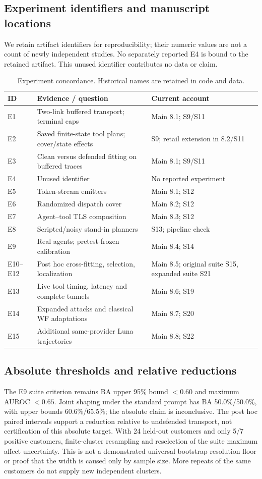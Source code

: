 \subsection{Experiment identifiers and manuscript locations}
We retain artifact identifiers for reproducibility; their numeric values are not a count of newly independent studies. No separately reported E4 is bound to the retained artifact. This unused identifier contributes no data or claim.
\begin{table}[!ht]\centering\footnotesize
\caption{Experiment concordance. Historical names are retained in code and data.}\label{tab:experiment-concordance}
\begin{tabularx}{\columnwidth}{@{}lYY@{}}\toprule
ID & Evidence / question & Current account\\\midrule
E1 & Two-link buffered transport; terminal caps & Main 8.1; S9/S11\\
E2 & Saved finite-state tool plans; cover/state effects & S9; retail extension in 8.2/S11\\
E3 & Clean versus defended fitting on buffered traces & Main 8.1; S9/S11\\
E4 & Unused identifier & No reported experiment\\
E5 & Token-stream emitters & Main 8.1; S12\\
E6 & Randomized dispatch cover & Main 8.2; S12\\
E7 & Agent--tool TLS composition & Main 8.3; S12\\
E8 & Scripted/noisy stand-in planners & S13; pipeline check\\
E9 & Real agents; pretest-frozen calibration & Main 8.4; S14\\
E10--E12 & Post hoc cross-fitting, selection, localization & Main 8.5; original suite S15, expanded suite S21\\
E13 & Live tool timing, latency and complete tunnels & Main 8.6; S19\\
E14 & Expanded attacks and classical WF adaptations & Main 8.7; S20\\
E15 & Additional same-provider Luna trajectories & Main 8.8; S22\\
\bottomrule\end{tabularx}\end{table}

\subsection{Absolute thresholds and relative reductions}
The E9 suite criterion remains BA upper 95\% bound $<0.60$ and maximum AUROC $<0.65$. Joint shaping under the standard prompt has BA 50.0\%/50.0\%, with upper bounds 60.6\%/65.5\%; the absolute claim is inconclusive. The post hoc paired intervals support a reduction relative to undefended transport, not certification of this absolute target. With 24 held-out customers and only 5/7 positive customers, finite-cluster resampling and reselection of the suite maximum affect uncertainty. This is not a demonstrated universal bootstrap resolution floor or proof that the width is caused only by sample size. More repeats of the same customers do not supply new independent clusters.

